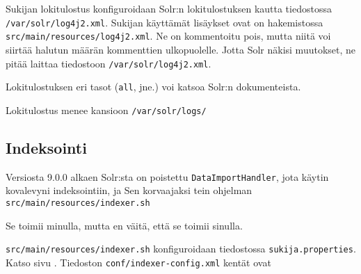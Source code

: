 \documentclass[12pt]{article}
\begin{document}
Sukijan lokitulostus konfiguroidaan Solr:n lokitulostuksen kautta
tiedostossa \verb=/var/solr/log4j2.xml=. Sukijan käyttämät lisäykset
ovat on hakemistossa \verb=src/main/resources/log4j2.xml=. Ne on
kommentoitu pois, mutta niitä voi siirtää halutun määrän kommenttien
ulkopuolelle. Jotta Solr näkisi muutokset, ne pitää laittaa tiedostoon
\verb=/var/solr/log4j2.xml=.

Lokitulostuksen eri tasot (\verb=all=, jne.) voi katsoa Solr:n
dokumenteista.

Lokitulostus menee kansioon \verb=/var/solr/logs/=


\newpage
\subsection*{Indeksointi}

Versiosta 9.0.0 alkaen Solr:sta on poistettu \verb=DataImportHandler=,
jota käytin kovalevyni indeksointiin, ja Sen korvaajaksi tein ohjelman
\verb=src/main/resources/indexer.sh=

Se toimii minulla, mutta en väitä, että se toimii sinulla.

\verb=src/main/resources/indexer.sh= konfiguroidaan tiedostossa
\verb|sukija.properties|. Katso sivu .
Tiedoston \verb=conf/indexer-config.xml= kentät ovat
\end{document}
